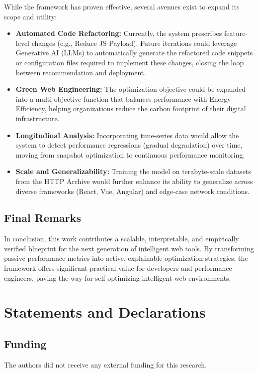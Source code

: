 \documentclass[sn-nature]{sn-jnl}
\begin{document}
While the framework has proven effective, several avenues exist to expand its scope and utility:
\begin{itemize}
    \item \textbf{Automated Code Refactoring:} Currently, the system prescribes feature-level changes (e.g., Reduce JS Payload). Future iterations could leverage Generative AI (LLMs) to automatically generate the refactored code snippets or configuration files required to implement these changes, closing the loop between recommendation and deployment.
    \item \textbf{Green Web Engineering:} The optimization objective could be expanded into a multi-objective function that balances performance with Energy Efficiency, helping organizations reduce the carbon footprint of their digital infrastructure.
    \item \textbf{Longitudinal Analysis:} Incorporating time-series data would allow the system to detect performance regressions (gradual degradation) over time, moving from snapshot optimization to continuous performance monitoring.
    \item \textbf{Scale and Generalizability:} Training the model on terabyte-scale datasets from the HTTP Archive would further enhance its ability to generalize across diverse frameworks (React, Vue, Angular) and edge-case network conditions.
\end{itemize}

\subsection{Final Remarks}

In conclusion, this work contributes a scalable, interpretable, and empirically verified blueprint for the next generation of intelligent web tools. By transforming passive performance metrics into active, explainable optimization strategies, the framework offers significant practical value for developers and performance engineers, paving the way for self-optimizing intelligent web environments.

\section*{Statements and Declarations}

\subsection*{Funding}
The authors did not receive any external funding for this research.
\end{document}
